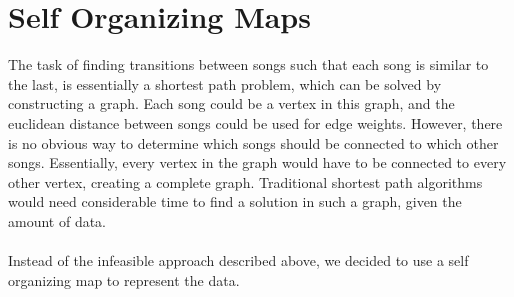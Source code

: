 \section{Self Organizing Maps} %
\label{sec:self_organizing_maps}
The task of finding transitions between songs such that each song is similar to the last, is essentially a shortest path problem, which can be solved by constructing a graph. Each song could be a vertex in this graph, and the euclidean distance between songs could be used for edge weights. However, there is no obvious way to determine which songs should be connected to which other songs. Essentially, every vertex in the graph would have to be connected to every other vertex, creating a complete graph. Traditional shortest path algorithms would need considerable time to find a solution in such a graph, given the amount of data.
\\\\
Instead of the infeasible approach described above, we decided to use a self organizing map to represent the data.


